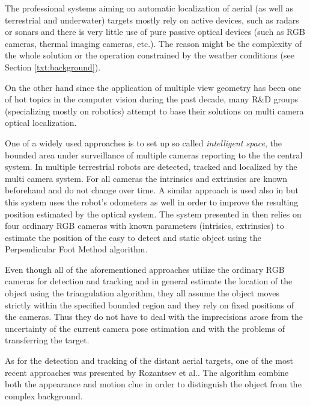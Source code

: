 The professional systems aiming on automatic localization of aerial (as well as terrestrial and underwater) targets mostly rely on active devices, such as radars or sonars and there is very little use of pure passive optical devices (such as RGB cameras, thermal imaging cameras, etc.). The reason might be the complexity of the whole solution or the operation constrained by the weather conditions (see Section \ref{txt:background}).

On the other hand since the application of multiple view geometry has been one of hot topics in the computer vision during the past decade, many R\&D groups (specializing mostly on robotics) attempt to base their solutions on multi camera optical localization.

One of a widely used approaches is to set up so called \textit{intelligent space}\cite{intelligentSpace}, the bounded area under surveillance of multiple cameras reporting to the the central system. In \cite{Multi-Camera_Sensor_System_for_3D_Segmentation} multiple terrestrial robots are detected, tracked and localized by the multi camera system. For all cameras the intrinsics and extrinsics are known beforehand and do not change over time.  A similar approach is used also in \cite{Localization_and_Geometric_Reconstruction_of_Mobile_Robots} but this system uses the robot's odometers as well in order to improve the resulting position estimated by the optical system. The system presented in \cite{A_3D_visual_localization} then relies on four ordinary RGB cameras with known parameters (intrisics, extrinsics) to estimate the position of the easy to detect and static object using the Perpendicular Foot Method algorithm.

Even though all of the aforementioned approaches utilize the ordinary RGB cameras for detection and tracking and in general estimate the location of the object using the triangulation algorithm, they all assume the object moves strictly within the specified bounded region and they rely on fixed positions of the cameras. Thus they do not have to deal with the imprecisions arose from the uncertainty of the current camera pose estimation and with the problems of transferring the target. 

As for the detection and tracking of the distant aerial targets, one of the most recent approaches was presented by Rozantsev et al.\cite{DBLP:journals/corr/RozantsevLF14}. The algorithm combine both the appearance and motion clue in order to distinguish the object from the complex background.

